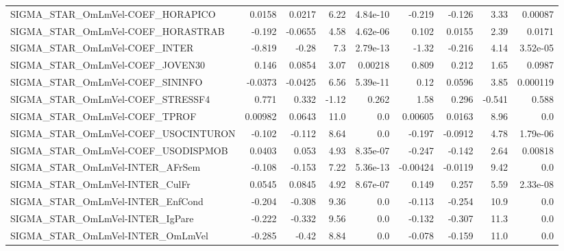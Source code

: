 \begin{tabular}{lrrrrrrrr}
SIGMA\_STAR\_OmLmVel-COEF\_HORAPICO      &      0.0158 &       0.0217 &    6.22 & 4.84e-10 &     -0.219 &      -0.126 &         3.33 &       0.00087 \\
SIGMA\_STAR\_OmLmVel-COEF\_HORASTRAB     &      -0.192 &      -0.0655 &    4.58 & 4.62e-06 &      0.102 &      0.0155 &         2.39 &        0.0171 \\
SIGMA\_STAR\_OmLmVel-COEF\_INTER         &      -0.819 &        -0.28 &     7.3 & 2.79e-13 &      -1.32 &      -0.216 &         4.14 &      3.52e-05 \\
SIGMA\_STAR\_OmLmVel-COEF\_JOVEN30       &       0.146 &       0.0854 &    3.07 &  0.00218 &      0.809 &       0.212 &         1.65 &        0.0987 \\
SIGMA\_STAR\_OmLmVel-COEF\_SININFO       &     -0.0373 &      -0.0425 &    6.56 & 5.39e-11 &       0.12 &      0.0596 &         3.85 &      0.000119 \\
SIGMA\_STAR\_OmLmVel-COEF\_STRESSF4      &       0.771 &        0.332 &   -1.12 &    0.262 &       1.58 &       0.296 &       -0.541 &         0.588 \\
SIGMA\_STAR\_OmLmVel-COEF\_TPROF         &     0.00982 &       0.0643 &    11.0 &      0.0 &    0.00605 &      0.0163 &         8.96 &           0.0 \\
SIGMA\_STAR\_OmLmVel-COEF\_USOCINTURON   &      -0.102 &       -0.112 &    8.64 &      0.0 &     -0.197 &     -0.0912 &         4.78 &      1.79e-06 \\
SIGMA\_STAR\_OmLmVel-COEF\_USODISPMOB    &      0.0403 &        0.053 &    4.93 & 8.35e-07 &     -0.247 &      -0.142 &         2.64 &       0.00818 \\
SIGMA\_STAR\_OmLmVel-INTER\_AFrSem       &      -0.108 &       -0.153 &    7.22 & 5.36e-13 &   -0.00424 &     -0.0119 &         9.42 &           0.0 \\
SIGMA\_STAR\_OmLmVel-INTER\_CulFr        &      0.0545 &       0.0845 &    4.92 & 8.67e-07 &      0.149 &       0.257 &         5.59 &      2.33e-08 \\
SIGMA\_STAR\_OmLmVel-INTER\_EnfCond      &      -0.204 &       -0.308 &    9.36 &      0.0 &     -0.113 &      -0.254 &         10.9 &           0.0 \\
SIGMA\_STAR\_OmLmVel-INTER\_IgPare       &      -0.222 &       -0.332 &    9.56 &      0.0 &     -0.132 &      -0.307 &         11.3 &           0.0 \\
SIGMA\_STAR\_OmLmVel-INTER\_OmLmVel      &      -0.285 &        -0.42 &    8.84 &      0.0 &     -0.078 &      -0.159 &         11.0 &           0.0 \\

\end{tabular}
